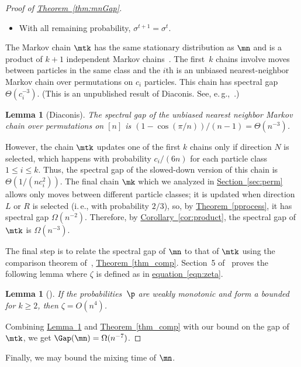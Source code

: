 \documentclass[11pt]{article}
\newtheorem{lemma}[theorem]{Lemma}
\providecommand{\ie}{i.\,e.}
\providecommand{\eg}{e.\,g.}
\providecommand{\expref}[2]{\texorpdfstring{\hyperref[#2]{#1~\ref{#2}}}{#1~\ref{#2}}}
\providecommand{\expeqref}[2]{\texorpdfstring{\hyperref[#2]{#1~\eqref{#2}}}{#1~\eqref{#2}}}
\begin{document}
\begin{proof}[Proof of \expref{Theorem}{thm:mnGap}]
\begin{itemize}
\item With all remaining probability, $\sigma^{t+1} = \sigma^t.$
\end{itemize}

The Markov chain $\mtk$ has the same
stationary distribution as $\mn$ and is a product of
$k+1$ independent Markov chains~\cite{MS}.  The first~$k$ chains involve moves
between particles in the same class and the $i$th is an unbiased
nearest-neighbor Markov chain over permutations on $c_i$ particles.
%
%
%
This chain has spectral gap $\Theta(c_i^{-3})$. (This is an 
unpublished result of Diaconis. See, \eg,~\cite{wilson}.)    %
\begin{lemma}[Diaconis]
The spectral gap of the unbiased nearest neighbor Markov chain
over permutations on $[n]$ is $(1-\cos(\pi/n))/(n-1)=\Theta(n^{-3})$.
\end{lemma}
\noindent However, the chain $\mtk$ updates one of the first $k$ chains
only if direction $N$ is selected,  which happens with probability $c_i/(6n)$
for each particle class $1\leq i \leq k.$  Thus, the spectral gap of
the slowed-down version of this chain is $\Theta(1/(nc_i^2))$.
The final chain $\mk$ which we analyzed in \expref{Section}{sec:perm}
allows only moves between different particle classes; it is updated when
direction $L$ or $R$ is selected (\ie,  with probability $2/3$),
so,  %
by
\expref{Theorem}{pprocess}, it has spectral gap  $\Omega(n^{-2})$.
Therefore, by \expref{Corollary}{cor:product}, the spectral gap of $\mtk$
is $\Omega(n^{-3})$.

The final step is to relate the spectral gap of $\mn$ to that of $\mtk$
using the comparison theorem of~\cite{dsc}, \expref{Theorem}{thm_comp}.  
Section~5 of~\cite{MS} proves the following lemma where $\zeta$ is 
defined as in \expeqref{equation}{eqn:zeta}.

\begin{lemma}[\cite{MS}]\label{lem_comp} If the probabilities~$\p$ are
  weakly monotonic and form a bounded \kP\, for $k\geq 2$, then $\zeta=O(n^4)$.
\end{lemma}

\noindent Combining \expref{Lemma}{lem_comp} and \expref{Theorem}{thm_comp}
with our bound on the gap of $\mtk$, we get $\Gap(\mn)=\Omega(n^{-7})$. 
%
\end{proof}

\vspace{.2in}

Finally, we may bound the mixing time of $\mn$. 
\end{document}
